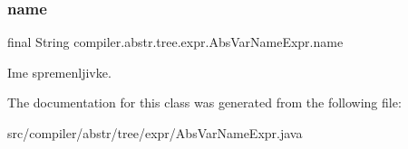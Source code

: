 \subsubsection{\texorpdfstring{name}{name}}
{\footnotesize\ttfamily final String compiler.\+abstr.\+tree.\+expr.\+Abs\+Var\+Name\+Expr.\+name}

Ime spremenljivke. 

The documentation for this class was generated from the following file\+:\begin{DoxyCompactItemize}
\item 
src/compiler/abstr/tree/expr/Abs\+Var\+Name\+Expr.\+java\end{DoxyCompactItemize}
